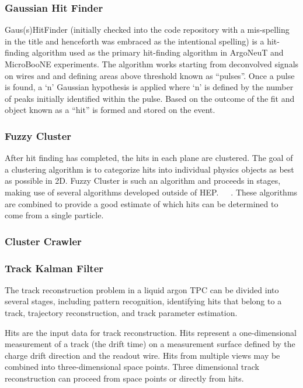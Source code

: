 \documentclass[12pt]{elsarticle}
\begin{document}
\subsubsection{Gaussian Hit Finder}
Gaus(s)HitFinder (initially checked into the code repository with a mis-spelling in the title and henceforth was embraced as the intentional spelling) is a hit-finding algorithm used as the primary hit-finding algorithm in ArgoNeuT and MicroBooNE experiments. The algorithm works starting from deconvolved signals on wires and and defining areas above threshold known as ``pulses''. Once a pulse is found, a `n' Gaussian hypothesis is applied where `n' is defined by the number of peaks initially identified within the pulse. Based on the outcome of the fit and object known as a ``hit'' is formed and stored on the event.

\subsubsection{Fuzzy Cluster}

After hit finding has completed, the hits in each plane are clustered. The goal of a clustering algorithm is to categorize hits into individual physics objects as best as possible in 2D. Fuzzy Cluster is such an algorithm and proceeds in stages, making use of several algorithms developed outside of HEP.~\cite{flame}~\cite{ppht}~\cite{dbscan}. These algorithms are combined to provide a good estimate of which hits can be determined to come from a single particle.

\subsubsection{Cluster Crawler}

\subsubsection{Track Kalman Filter}

The track reconstruction problem in a liquid argon TPC can be
divided into several stages, including pattern recognition, 
identifying hits that belong to a track, trajectory reconstruction,
and track parameter estimation. 

Hits are the input data for track reconstruction.  Hits
represent a one-dimensional measurement of a track (the
drift time) on a measurement surface defined by the charge drift
direction and the readout wire. Hits from multiple views may be combined
into three-dimensional space points. Three dimensional track
reconstruction can proceed from space points or directly from hits.
\end{document}
